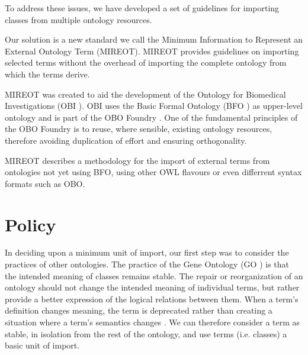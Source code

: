 \documentclass[a4paper,10pt,twocolumn]{article}
\begin{document}

To address these issues, we have developed a set of guidelines for importing classes from multiple ontology resources.


Our solution is a new standard we call the Minimum Information to Represent an External Ontology Term (MIREOT).
MIREOT provides guidelines on importing selected terms without the overhead of importing the complete ontology from which the terms derive. 


MIREOT was created to aid the development of the Ontology for Biomedical Investigations (OBI  \cite{RefWorks:1507}).
OBI uses the Basic Formal Ontology (BFO \cite{RefWorks:1557}) as upper-level ontology and is part of the OBO Foundry \cite{RefWorks:1472}. 
One of the fundamental principles of the OBO Foundry is to reuse, where sensible, existing ontology resources, therefore avoiding duplication of effort and ensuring orthogonality.


MIREOT describes a methodology for the import of external terms from ontologies not yet using BFO, using other OWL flavours or even differrent syntax formats such as OBO.

\section*{Policy}

In deciding upon a minimum unit of import, our first step was to consider the practices of other ontologies.
The practice of the Gene Ontology (GO \cite{RefWorks:79}) is that the intended meaning of classes remains stable.
The repair or reorganization of an ontology should not change the intended meaning of individual terms, but rather provide a better expression of the logical relations between them.
When a term's definition changes meaning, the term is deprecated rather than creating a situation where a term's semantics changes \cite{RefWorks:1560}.
We can therefore consider a term as stable, in isolation from the rest of the ontology, and use terms (i.e. classes) a basic unit of import. 
\end{document}
